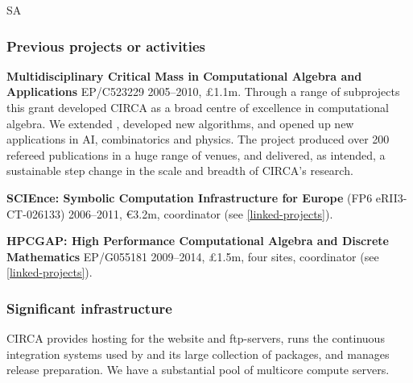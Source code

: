 \begin{sitedescription}{SA}
\begin{compactenum}
\end{compactenum}

\subsubsection*{Previous projects or activities}

\begin{compactenum}
\item
\textbf{Multidisciplinary Critical Mass in Computational
Algebra and Applications} EP/C523229 2005--2010, \pounds 1.1m.
Through a range of subprojects this grant developed CIRCA as 
a broad centre of excellence in computational algebra. We 
extended \GAP, developed new algorithms, and opened up new 
applications in AI, combinatorics and physics. The project 
produced over 200 refereed publications in a huge range of 
venues, and delivered, as intended, a sustainable step change 
in the scale and breadth of CIRCA's research.
\item 
\textbf{SCIEnce: Symbolic Computation Infrastructure for Europe}
(FP6 eRII3-CT-026133) 2006--2011, \euro 3.2m, coordinator
(see \ref{linked-projects}).
\item
\textbf{HPCGAP: High Performance Computational Algebra and Discrete Mathematics} 
EP/G055181 2009--2014, \pounds 1.5m, four sites, coordinator (see \ref{linked-projects}).
\end{compactenum}

\subsubsection*{Significant infrastructure}

CIRCA provides hosting for the \GAP website and ftp-servers, runs the 
continuous integration systems used by \GAP and its large collection
of  packages, and manages \GAP release preparation. We have a
substantial pool of multicore compute servers.
\end{sitedescription}


